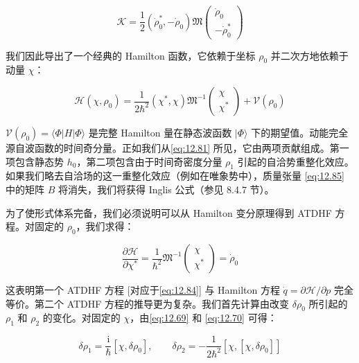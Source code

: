 \begin{equation}
\mathcal{K}=\frac{1}{2}(\dot{\rho}^{*}_{0},-\dot{\rho}_{0})\mathfrak{M}\left(\begin{array}{c}
\dot{\rho}_{0}\\
-\dot{\rho}^{*}_{0}
\end{array}\right)\label{eq:12.86}
\end{equation}

我们因此导出了一个经典的 Hamilton 函数，它依赖于坐标 $\rho_{0}$ 并二次方地依赖于动量 $\chi$：

\begin{equation}
\mathcal{H}(\chi,\rho_{0})=\frac{1}{2\hbar^{2}}(\chi^{*},\chi)\mathfrak{M}^{-1}\left(\begin{array}{c}
\chi\\
\chi^{*}
\end{array}\right)+\mathcal{V}(\rho_{0})\label{eq:12.87}
\end{equation}

$\mathcal{V}(\rho_{0})=\langle\Phi|H|\Phi\rangle$ 是完整 Hamilton 量在静态波函数
$|\Phi\rangle$ 下的期望值。动能完全源自波函数的时间奇分量。正如我们从\ref{eq:12.81} 所见，它由两项贡献组成。第一项包含静态势
$h_{0}$，第二项包含由于时间奇密度分量 $\rho_{1}$ 引起的自洽势重整化效应。如果我们略去自洽场的这一重整化效应（例如在唯象势中），质量张量
\ref{eq:12.85} 中的矩阵 $B$ 将消失，我们将获得 Inglis 公式（参见 8.4.7 节）。

为了使形式体系完备，我们必须说明可以从 Hamilton 变分原理得到 ATDHF 方程。对固定的 $\rho_{0}$，我们求得：

\begin{equation}
\frac{\partial\mathcal{H}}{\partial\chi^{*}}=\frac{1}{\hbar^{2}}\mathfrak{M}^{-1}\left(\begin{array}{c}
\chi\\
\chi^{*}
\end{array}\right)=\dot{\rho}_{0}\label{eq:12.88}
\end{equation}

这表明第一个 ATDHF 方程 {[}对应于\ref{eq:12.84}{]} 与 Hamilton 方程 $\dot{q}=\partial\mathcal{H}/\partial p$
完全等价。第二个 ATDHF 方程的推导更为复杂。我们首先计算由改变 $\delta\rho_{0}$ 所引起的 $\rho_{1}$
和 $\rho_{2}$ 的变化。对固定的 $\chi$，由\ref{eq:12.69} 和 \ref{eq:12.70}
可得：

\begin{equation}
\delta\rho_{1}=\frac{\mathrm{i}}{\hbar}[\chi,\delta\rho_{0}],\qquad\delta\rho_{2}=-\frac{1}{2\hbar^{2}}[\chi,[\chi,\delta\rho_{0}]]\label{eq:12.89}
\end{equation}

